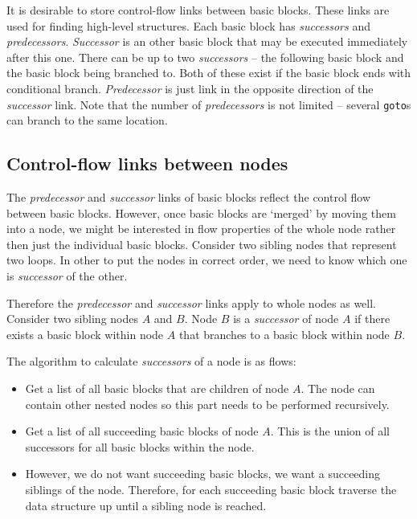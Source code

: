 \documentclass[12pt,twoside,notitlepage]{report}
\begin{document}
It is desirable to store control-flow links between basic blocks.  
These links are used for finding high-level structures.  
Each basic block has \emph{successors} and \emph{predecessors}.  
\emph{Successor} is an other basic block that may be executed
immediately after this one.
There can be up to two \emph{successors} -- the following basic 
block and the basic block being branched to.  Both of these
exist if the basic block ends with conditional branch.
\emph{Predecessor} is just link in the opposite direction 
of the \emph{successor} link.  Note that the number of 
\emph{predecessors} is not limited -- several \verb|goto|s
can branch to the same location.


\subsection{Control-flow links between nodes}

The \emph{predecessor} and \emph{successor} links of basic
blocks reflect the control flow between basic blocks.
However, once basic blocks are `merged' by moving them
into a node, we might be interested in flow properties
of the whole node rather then just the individual basic blocks.
Consider two sibling nodes that represent two loops.
In other to put the nodes in correct order, we need to know
which one is \emph{successor} of the other.

Therefore the \emph{predecessor} and \emph{successor} links
apply to whole nodes as well.  Consider two sibling nodes $A$ and $B$.
Node $B$ is a \emph{successor} of node $A$ if there exists 
a basic block within node $A$ that branches to a basic block 
within node $B$.

The algorithm to calculate \emph{successors} of a node is
as flows:
\begin{itemize}
	\item Get a list of all basic blocks that are children of
	node $A$.  The node can contain other nested nodes so this part
	needs to be performed recursively.
	\item Get a list of all succeeding basic blocks of node $A$.
	This is the union of all successors for all basic blocks 
	within the node.
	\item However, we do not want succeeding basic blocks,
	we want a succeeding siblings of the node.  Therefore,
	for each succeeding basic block traverse the data structure
	up until a sibling node is reached.
\end{itemize}
\end{document}
